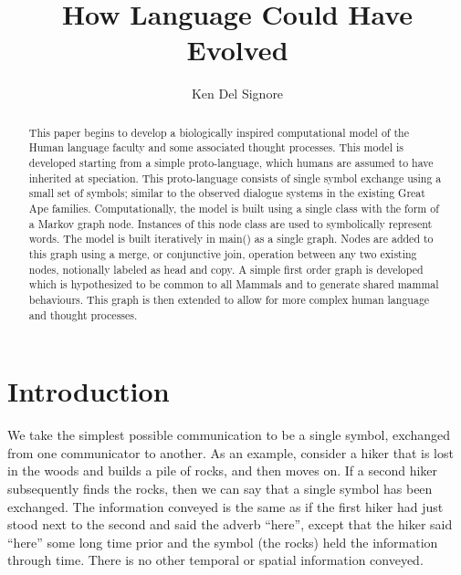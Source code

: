 \documentclass{clv3}
\begin{document}
\title{How Language Could Have Evolved}

\author{Ken Del Signore}


\maketitle

\begin{abstract}

  This paper begins to develop a biologically inspired computational model of the Human language faculty and some associated thought processes.  This model is developed starting from a simple proto-language, which humans are assumed to have inherited at speciation.  This proto-language consists of single symbol exchange using a small set of symbols;  similar to the observed dialogue systems in the existing Great Ape families.  Computationally, the model is built using a single class with the form of a Markov graph node.   Instances of this node class are used to symbolically represent words.   The model is built iteratively in main()  as a single graph.  Nodes are added to this graph using a merge, or conjunctive join, operation  between any two existing nodes, notionally labeled as head and copy.  A simple first order  graph is developed which is hypothesized to be common to all Mammals and to generate shared mammal behaviours.   This graph is then extended to allow for more  complex human language and thought processes.

\end{abstract}







\vspace{1cm}




\section{Introduction}

We take the simplest possible communication to be a single symbol, exchanged from one communicator to another.   As an example, consider a hiker that is lost in the woods and builds a pile of rocks, and then moves on.  If a second hiker subsequently finds the rocks, then we can say that a single symbol has been exchanged.  The information conveyed is the same as if the first hiker had just stood next to the second and said the adverb “here”, except that the hiker said “here” some long time prior and the symbol (the rocks) held the information through time.  There is no other temporal or spatial information conveyed.
\end{document}
